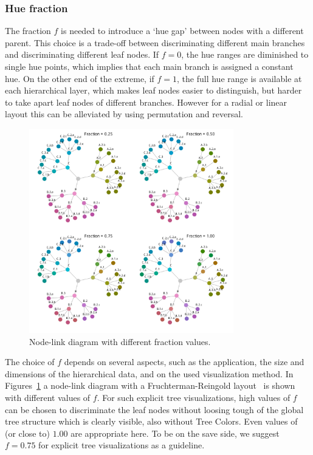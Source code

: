 \documentclass[review,journal]{vgtc}         %
\begin{document}
\subsubsection{Hue fraction}\label{secf}

The fraction $f$ is needed to introduce a `hue gap' between nodes with a different parent. This choice is a trade-off between discriminating different main branches and discriminating different leaf nodes. If $f=0$, the hue ranges are diminished to single hue points, which implies that each main branch is assigned a constant hue. On the other end of the extreme, if $f=1$, the full hue range is available at each hierarchical layer, which makes leaf nodes easier to distinguish, but harder to take apart leaf nodes of different branches. However for a radial or linear layout this can be alleviated by using permutation and reversal.

\begin{figure}[tb]
  \centering
  \includegraphics[width=3.5in]{Graph_hue.pdf}
  \caption{Node-link diagram with different fraction values.}\label{fig:graphf}
\end{figure}

The choice of $f$ depends on several aspects, such as the application, the size and dimensions of the hierarchical data, and on the used visualization method. In Figures~\ref{fig:graphf} a node-link diagram with a Fruchterman-Reingold layout~\cite{Fruchterman91} is shown with different values of ${f}$. For such explicit tree visualizations, high values of ${f}$ can be chosen to discriminate the leaf nodes without loosing tough of the global tree structure which is clearly visible, also without Tree Colors. Even values of (or close to) $1.00$ are appropriate here. To be on the save side, we suggest $f=0.75$ for explicit tree visualizations as a guideline.
\end{document}
